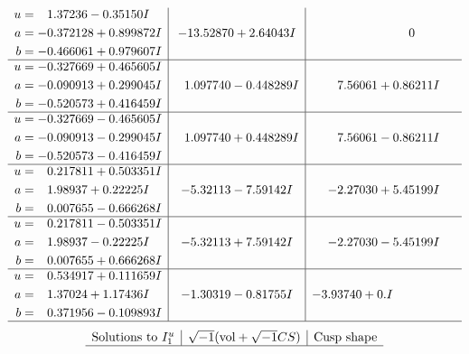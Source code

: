 \documentclass[1p]{elsarticle_modified}
\theoremstyle{definition}
\newcommand{\I}{\sqrt{-1}}
\begin{document}
$$\begin{array}{c|c|c}
\begin{aligned}
u &= \phantom{-}1.37236 - 0.35150 I \\
a &= -0.372128 + 0.899872 I \\
b &= -0.466061 + 0.979607 I\end{aligned}
 & -13.52870 + 2.64043 I & \phantom{-0.000000 } 0 \\ \hline\begin{aligned}
u &= -0.327669 + 0.465605 I \\
a &= -0.090913 + 0.299045 I \\
b &= -0.520573 + 0.416459 I\end{aligned}
 & \phantom{-}1.097740 - 0.448289 I & \phantom{-}7.56061 + 0.86211 I \\ \hline\begin{aligned}
u &= -0.327669 - 0.465605 I \\
a &= -0.090913 - 0.299045 I \\
b &= -0.520573 - 0.416459 I\end{aligned}
 & \phantom{-}1.097740 + 0.448289 I & \phantom{-}7.56061 - 0.86211 I \\ \hline\begin{aligned}
u &= \phantom{-}0.217811 + 0.503351 I \\
a &= \phantom{-}1.98937 + 0.22225 I \\
b &= \phantom{-}0.007655 - 0.666268 I\end{aligned}
 & -5.32113 - 7.59142 I & -2.27030 + 5.45199 I \\ \hline\begin{aligned}
u &= \phantom{-}0.217811 - 0.503351 I \\
a &= \phantom{-}1.98937 - 0.22225 I \\
b &= \phantom{-}0.007655 + 0.666268 I\end{aligned}
 & -5.32113 + 7.59142 I & -2.27030 - 5.45199 I \\ \hline\begin{aligned}
u &= \phantom{-}0.534917 + 0.111659 I \\
a &= \phantom{-}1.37024 + 1.17436 I \\
b &= \phantom{-}0.371956 - 0.109893 I\end{aligned}
 & -1.30319 - 0.81755 I & -3.93740 + 0. I\phantom{ +0.000000I}\\
 \hline 
 \end{array}$$\newpage$$\begin{array}{c|c|c}  
\text{Solutions to }I^u_{1}& \I (\text{vol} + \sqrt{-1}CS) & \text{Cusp shape}\\
 \hline 

\end{array}$$
\end{document}
